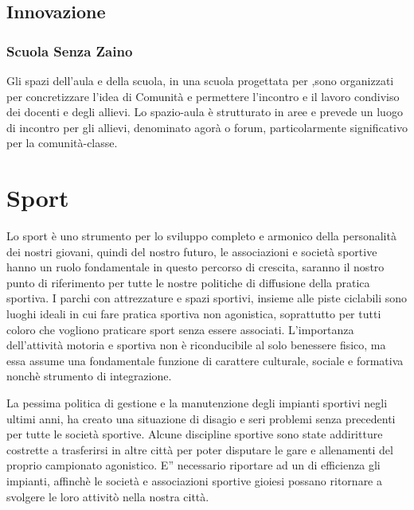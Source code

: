 \documentclass[a4paper,14pt,italian]{sphinxmanual}
\begin{document}
\section{Innovazione}
\label{\detokenize{scuola:innovazione}}

\subsection{Scuola Senza Zaino}
\label{\detokenize{scuola:scuola-senza-zaino}}
Gli spazi dell’aula e della scuola, in una scuola progettata per  ,sono organizzati per concretizzare l’idea di Comunità e permettere l’incontro e il lavoro condiviso dei docenti e degli allievi.
Lo spazio-aula è strutturato in aree e prevede un luogo di incontro per gli allievi, denominato agorà o forum, particolarmente significativo per la comunità-classe.




\chapter{Sport}
\label{\detokenize{sport:sport}}\label{\detokenize{sport::doc}}

Lo sport è uno strumento per lo sviluppo completo e armonico della personalità dei nostri giovani, quindi del nostro futuro, le associazioni e società sportive hanno un ruolo fondamentale in questo percorso di crescita, saranno il nostro punto di riferimento per tutte le nostre politiche di diffusione della pratica sportiva.
I parchi con attrezzature e spazi sportivi, insieme alle piste ciclabili sono luoghi ideali in cui fare pratica sportiva non agonistica, soprattutto per tutti coloro che vogliono praticare sport senza essere associati.
L’importanza dell’attività motoria e sportiva non è riconducibile al solo benessere fisico, ma essa assume una fondamentale funzione di carattere culturale, sociale e formativa nonchè strumento di integrazione.

La pessima politica di gestione e la manutenzione degli impianti sportivi negli ultimi anni, ha creato una situazione di disagio e seri problemi senza precedenti per tutte le società sportive.
Alcune discipline sportive sono state addiritture costrette a trasferirsi in altre città per poter disputare le gare e allenamenti del proprio campionato agonistico.
E” necessario riportare ad un  di efficienza gli impianti, affinchè le società e associazioni sportive gioiesi possano ritornare a svolgere le loro attivitò nella nostra città.
\end{document}
